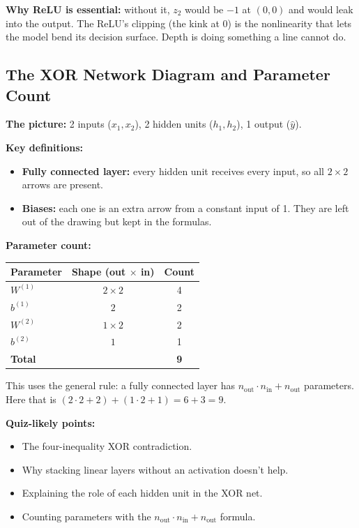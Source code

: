 \textbf{Why ReLU is essential:} without it, $z_2$ would be $-1$ at $(0,0)$ and would leak into the output. The ReLU's clipping (the kink at 0) is the nonlinearity that lets the model bend its decision surface. Depth is doing something a line cannot do.


\subsection*{The XOR Network Diagram and Parameter Count}

\textbf{The picture:} 2 inputs ($x_1, x_2$), 2 hidden units ($h_1, h_2$), 1 output ($\hat{y}$).

\textbf{Key definitions:}
\begin{itemize}
  \item \textbf{Fully connected layer:} every hidden unit receives every input, so all $2 \times 2$ arrows are present.
  \item \textbf{Biases:} each one is an extra arrow from a constant input of 1. They are left out of the drawing but kept in the formulas.
\end{itemize}

\textbf{Parameter count:}
\begin{center}
\begin{tabular}{lcc}
\toprule
Parameter & Shape (out $\times$ in) & Count \\
\midrule
$W^{(1)}$ & $2 \times 2$ & 4 \\
$b^{(1)}$ & $2$ & 2 \\
$W^{(2)}$ & $1 \times 2$ & 2 \\
$b^{(2)}$ & $1$ & 1 \\
\midrule
\textbf{Total} & & \textbf{9} \\
\bottomrule
\end{tabular}
\end{center}

This uses the general rule: a fully connected layer has $n_{\text{out}} \cdot n_{\text{in}} + n_{\text{out}}$ parameters. Here that is $(2 \cdot 2 + 2) + (1 \cdot 2 + 1) = 6 + 3 = 9$.

\textbf{Quiz-likely points:}
\begin{itemize}
  \item The four-inequality XOR contradiction.
  \item Why stacking linear layers without an activation doesn't help.
  \item Explaining the role of each hidden unit in the XOR net.
  \item Counting parameters with the $n_{\text{out}} \cdot n_{\text{in}} + n_{\text{out}}$ formula.
\end{itemize}